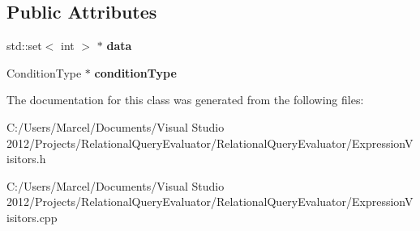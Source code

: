 \subsection*{Public Attributes}
\begin{DoxyCompactItemize}
\item 
\hypertarget{class_join_info_reading_expression_visitor_aa7bdb75b8bb8ddbbb551c26f798503ca}{std\+::set$<$ int $>$ $\ast$ {\bfseries data}}\label{class_join_info_reading_expression_visitor_aa7bdb75b8bb8ddbbb551c26f798503ca}

\item 
\hypertarget{class_join_info_reading_expression_visitor_af7219e9cb55b9a59763a06df0656a63f}{Condition\+Type $\ast$ {\bfseries condition\+Type}}\label{class_join_info_reading_expression_visitor_af7219e9cb55b9a59763a06df0656a63f}

\end{DoxyCompactItemize}


The documentation for this class was generated from the following files\+:\begin{DoxyCompactItemize}
\item 
C\+:/\+Users/\+Marcel/\+Documents/\+Visual Studio 2012/\+Projects/\+Relational\+Query\+Evaluator/\+Relational\+Query\+Evaluator/Expression\+Visitors.\+h\item 
C\+:/\+Users/\+Marcel/\+Documents/\+Visual Studio 2012/\+Projects/\+Relational\+Query\+Evaluator/\+Relational\+Query\+Evaluator/Expression\+Visitors.\+cpp\end{DoxyCompactItemize}
